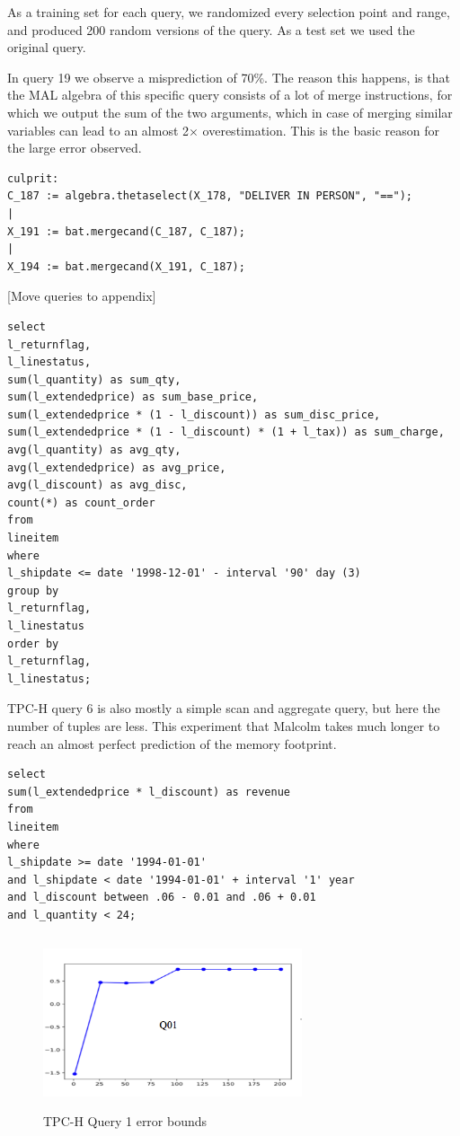 \documentclass[conference]{IEEEtran}
\begin{document}
As a training set for each query, we randomized every selection point and range,
and produced 200 random versions of the query. As a test set we used the original
query.

In query 19 we observe a misprediction of 70\%. The reason this happens, is that
the MAL algebra of this specific query consists of a lot of merge instructions,
for which we output the sum of the two arguments, which in case of merging similar
variables can lead to an almost 2$\times$ overestimation.
This is the basic reason for the large error observed.
\begin{verbatim}
culprit:
C_187 := algebra.thetaselect(X_178, "DELIVER IN PERSON", "==");                                                                                                                                                                                                                    |
X_191 := bat.mergecand(C_187, C_187);                                                                                                                                                                                                                                              |
X_194 := bat.mergecand(X_191, C_187);
\end{verbatim}
[Move queries to appendix]
\begin{verbatim}
select
l_returnflag,
l_linestatus,
sum(l_quantity) as sum_qty,
sum(l_extendedprice) as sum_base_price,
sum(l_extendedprice * (1 - l_discount)) as sum_disc_price,
sum(l_extendedprice * (1 - l_discount) * (1 + l_tax)) as sum_charge,
avg(l_quantity) as avg_qty,
avg(l_extendedprice) as avg_price,
avg(l_discount) as avg_disc,
count(*) as count_order
from
lineitem
where
l_shipdate <= date '1998-12-01' - interval '90' day (3)
group by
l_returnflag,
l_linestatus
order by
l_returnflag,
l_linestatus;
\end{verbatim}

TPC-H query 6 is also mostly a simple scan and aggregate query, but here the number of
tuples are less. This experiment that Malcolm takes much longer to reach an almost perfect
prediction of the memory footprint.

\begin{verbatim}
select
sum(l_extendedprice * l_discount) as revenue
from
lineitem
where
l_shipdate >= date '1994-01-01'
and l_shipdate < date '1994-01-01' + interval '1' year
and l_discount between .06 - 0.01 and .06 + 0.01
and l_quantity < 24;
\end{verbatim}

\begin{figure}[t!]
	\centering
	\includegraphics[height=2in,width=3in]{Figures/Q1.png}
	\caption{TPC-H Query 1 error bounds
		\label{fig:q1}}
\end{figure}
\end{document}
